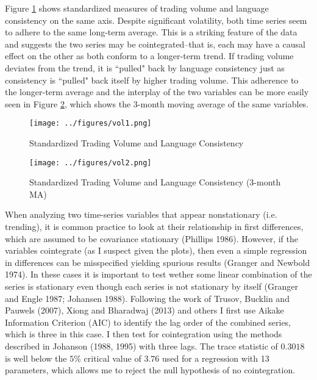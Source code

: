 Figure \ref{vol1} shows standardized measures of trading volume and language consistency on the same axis. Despite significant volatility, both time series seem to adhere to the same long-term average. This is a striking feature of the data and suggests the two series may be cointegrated--that is, each may have a causal effect on the other as both conform to a longer-term trend. If trading volume deviates from the trend, it is ``pulled" back by language consistency just as consistency is ``pulled" back itself by higher trading volume. This adherence to the longer-term average and the interplay of the two variables can be more easily seen in Figure \ref{vol2}, which shows the 3-month moving average of the same variables. 


\begin{figure}
\begin{center}
\texttt{[image: ../figures/vol1.png]}
\caption[Std. Trading Volume and Language Consistency]{Standardized Trading Volume and Language Consistency\label{vol1}}
\end{center}
\end{figure}

\begin{figure}
\begin{center}
\texttt{[image: ../figures/vol2.png]}
\caption[Std. Trading Volume and Language Consistency (3-mos. MA)]{Standardized Trading Volume and Language Consistency (3-month MA)\label{vol2}}
\end{center}
\end{figure}

When analyzing two time-series variables that appear nonstationary (i.e. trending), it is common practice to look at their relationship in first differences, which are assumed to be covariance stationary (Phillips 1986). However, if the variables cointegrate (as I suspect given the plots), then even a simple regression in differences can be misspecified yielding spurious results (Granger and Newbold 1974). In these cases it is important to test wether some linear combination of the series is stationary even though each series is not stationary by itself (Granger and Engle 1987; Johansen 1988). Following the work of Trusov, Bucklin and Pauwels (2007), Xiong and Bharadwaj (2013) and others I first use Aikake Information Criterion (AIC) to identify the lag order of the combined series, which is three in this case. I then test for cointegration using the methods described in Johanson (1988, 1995) with three lags. The trace statistic of $0.3018$ is well below the $5\%$ critical value of $3.76$ used for a regression with 13 parameters, which allows me to reject the null hypothesis of no cointegration.


